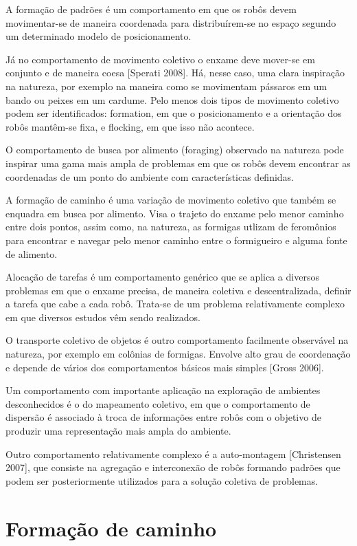 A formação de padrões é um comportamento em que os robôs devem movimentar-se de
maneira coordenada para distribuírem-se no espaço segundo um determinado modelo de
posicionamento.

Já no comportamento de movimento coletivo o enxame deve mover-se em conjunto e de
maneira coesa [Sperati 2008]. Há, nesse caso, uma clara inspiração na natureza, por exemplo na
maneira como se movimentam pássaros em um bando ou peixes em um cardume. Pelo menos
dois tipos de movimento coletivo podem ser identificados: formation, em que o posicionamento e a
orientação dos robôs mantêm-se fixa, e flocking, em que isso não acontece.

O comportamento de busca por alimento (foraging) observado na natureza pode inspirar
uma gama mais ampla de problemas em que os robôs devem encontrar as coordenadas de um
ponto do ambiente com características definidas.

A formação de caminho é uma variação de movimento coletivo que também se enquadra em busca por alimento. Visa o trajeto do enxame pelo menor caminho entre dois pontos, assim como, na natureza, as formigas utlizam de feromônios para encontrar e navegar pelo menor caminho entre o formigueiro e alguma fonte de alimento.

Alocação de tarefas é um comportamento genérico que se aplica a diversos problemas em
que o enxame precisa, de maneira coletiva e descentralizada, definir a tarefa que cabe a cada
robô. Trata-se de um problema relativamente complexo em que diversos estudos vêm sendo
realizados.

O transporte coletivo de objetos é outro comportamento facilmente observável na natureza,
por exemplo em colônias de formigas. Envolve alto grau de coordenação e depende de vários
dos comportamentos básicos mais simples [Gross 2006].

Um comportamento com importante aplicação na exploração de ambientes desconhecidos
é o do mapeamento coletivo, em que o comportamento de dispersão é associado à troca de
informações entre robôs com o objetivo de produzir uma representação mais ampla do ambiente.

Outro comportamento relativamente complexo é a auto-montagem [Christensen 2007], que
consiste na agregação e interconexão de robôs formando padrões que podem ser posteriormente
utilizados para a solução coletiva de problemas.

\section{Formação de caminho}

